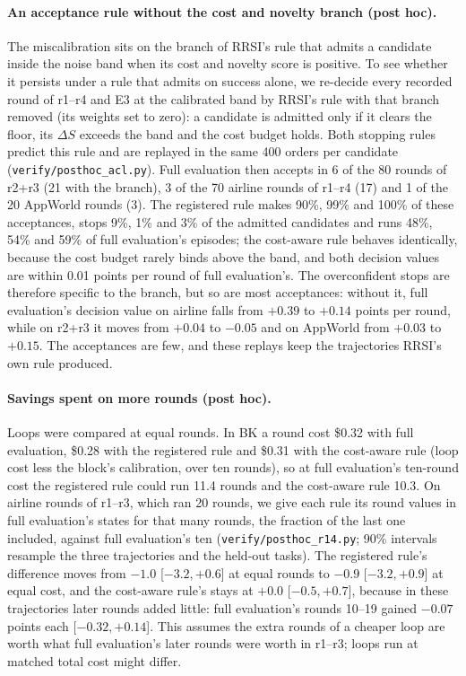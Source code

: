 \documentclass[11pt]{article}
\begin{document}
\paragraph{An acceptance rule without the cost and novelty branch (post hoc).} The miscalibration sits on the branch of RRSI's rule that admits a candidate inside the noise band when its cost and novelty score is positive. To see whether it persists under a rule that admits on success alone, we re-decide every recorded round of r1--r4 and E3 at the calibrated band by RRSI's rule with that branch removed (its weights set to zero): a candidate is admitted only if it clears the floor, its $\Delta S$ exceeds the band and the cost budget holds. Both stopping rules predict this rule and are replayed in the same 400 orders per candidate (\texttt{verify/posthoc\_acl.py}). Full evaluation then accepts in 6 of the 80 rounds of r2+r3 (21 with the branch), 3 of the 70 airline rounds of r1--r4 (17) and 1 of the 20 AppWorld rounds (3). The registered rule makes 90\%, 99\% and 100\% of these acceptances, stops 9\%, 1\% and 3\% of the admitted candidates and runs 48\%, 54\% and 59\% of full evaluation's episodes; the cost-aware rule behaves identically, because the cost budget rarely binds above the band, and both decision values are within 0.01 points per round of full evaluation's. The overconfident stops are therefore specific to the branch, but so are most acceptances: without it, full evaluation's decision value on airline falls from $+0.39$ to $+0.14$ points per round, while on r2+r3 it moves from $+0.04$ to $-0.05$ and on AppWorld from $+0.03$ to $+0.15$. The acceptances are few, and these replays keep the trajectories RRSI's own rule produced.

\paragraph{Savings spent on more rounds (post hoc).} Loops were compared at equal rounds. In BK a round cost \$0.32 with full evaluation, \$0.28 with the registered rule and \$0.31 with the cost-aware rule (loop cost less the block's calibration, over ten rounds), so at full evaluation's ten-round cost the registered rule could run 11.4 rounds and the cost-aware rule 10.3. On airline rounds of r1--r3, which ran 20 rounds, we give each rule its round values in full evaluation's states for that many rounds, the fraction of the last one included, against full evaluation's ten (\texttt{verify/posthoc\_r14.py}; 90\% intervals resample the three trajectories and the held-out tasks). The registered rule's difference moves from $-1.0$ [$-3.2,+0.6$] at equal rounds to $-0.9$ [$-3.2,+0.9$] at equal cost, and the cost-aware rule's stays at $+0.0$ [$-0.5,+0.7$], because in these trajectories later rounds added little: full evaluation's rounds 10--19 gained $-0.07$ points each [$-0.32,+0.14$]. This assumes the extra rounds of a cheaper loop are worth what full evaluation's later rounds were worth in r1--r3; loops run at matched total cost might differ.
\end{document}
